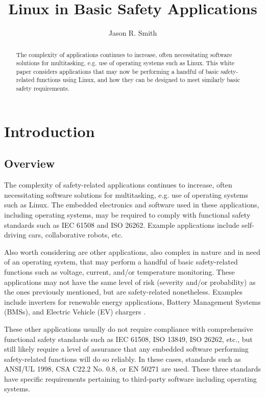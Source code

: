 \documentclass[12pt]{../Common_files/ElisaPaper}
\title{Linux in Basic Safety Applications}
\author{Jason R. Smith}
\begin{document}
	
\maketitle	
\begin{abstract}
The complexity of applications continues to increase, often necessitating software solutions for multitasking, e.g. use of operating systems such as Linux.  This white paper considers applications that may now be performing a handful of basic safety-related functions using Linux, and how they can be designed to meet similarly basic safety requirements.
\end{abstract}

\tableofcontents

\section{Introduction}
\subsection{Overview}
The complexity of safety-related applications continues to increase, often necessitating software solutions for multitasking, e.g. use of operating systems such as Linux.  The embedded electronics and software used in these applications, including operating systems, may be required to comply with functional safety standards such as IEC 61508 and ISO 26262.  Example applications include self-driving cars, collaborative robots, etc.  

Also worth considering are other applications, also complex in nature and in need of an operating system, that may perform a handful of basic safety-related functions such as voltage, current, and/or temperature monitoring.  These applications may not have the same level of risk (severity and/or probability) as the ones previously mentioned, but are safety-related nonetheless.  Examples include inverters for renewable energy applications, Battery Management Systems (BMSs), and Electric Vehicle (EV) chargers .

These other applications usually do not require compliance with comprehensive functional safety standards such as IEC 61508, ISO 13849, ISO 26262, etc., but still likely require a level of assurance that any embedded software performing safety-related functions will do so reliably.  In these cases, standards such as ANSI/UL 1998, CSA C22.2 No. 0.8, or EN 50271 are used.  These three standards have specific requirements pertaining to third-party software including operating systems.
\end{document}
